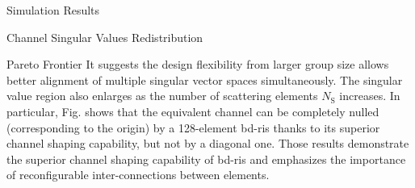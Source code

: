 \documentclass[journal]{IEEEtran}
\begin{document}
\begin{section}{Simulation Results}
\begin{subsection}{Channel Singular Values Redistribution}
\begin{subsubsection}{Pareto Frontier}
			It suggests the design flexibility from larger group size allows better alignment of multiple singular vector spaces simultaneously.
			The singular value region also enlarges as the number of scattering elements $N_\mathrm{S}$ increases.
			In particular, Fig.  shows that the equivalent channel can be completely nulled (corresponding to the origin) by a 128-element \gls{bd}-\gls{ris} thanks to its superior channel shaping capability, but not by a diagonal one.
			Those results demonstrate the superior channel shaping capability of \gls{bd}-\gls{ris} and emphasizes the importance of reconfigurable inter-connections between elements.
		\end{subsubsection}


\end{subsection}
\end{section}
\end{document}
